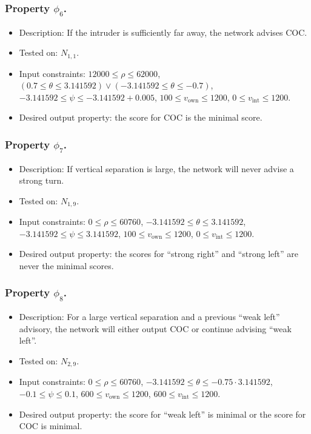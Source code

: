 \documentclass[a4paper]{llncs}
\begin{document}
\subsubsection{Property $\phi_6$.}
\begin{itemize}
\item Description:
  If the intruder is sufficiently far away,
  the network advises COC.
\item Tested on: $N_{1,1}$.
\item Input constraints:
    $12000 \leq \rho \leq 62000$,
    $(0.7 \leq \theta \leq 3.141592)
    \vee
    (-3.141592 \leq \theta \leq -0.7)$,
    $-3.141592 \leq \psi \leq -3.141592 + 0.005$,
    $100 \leq v_\text{own}\leq 1200$,
    $0 \leq v_\text{int}\leq 1200$.
\item Desired output property: the score for COC is the minimal score.
\end{itemize}


\subsubsection{Property $\phi_7$.}
\begin{itemize}
\item Description:
  If vertical separation is large,
  the network will never advise a strong turn.
\item Tested on: $N_{1,9}$.
\item Input constraints:
    $0 \leq \rho \leq 60760$,
    $-3.141592 \leq \theta \leq 3.141592$,
    $-3.141592 \leq \psi \leq 3.141592$,
    $100 \leq v_\text{own}\leq 1200$,
    $0 \leq v_\text{int}\leq 1200$.
\item Desired output property: the scores for ``strong right'' and
  ``strong left'' are never the minimal scores.
\end{itemize}

\subsubsection{Property $\phi_8$.}
\begin{itemize}
\item Description:
 For a large vertical separation and a previous
 ``weak left'' advisory, the network will either output COC or
 continue advising ``weak left''.
\item Tested on: $N_{2,9}$.
\item Input constraints:
    $0 \leq \rho \leq 60760$,
    $-3.141592 \leq \theta \leq -0.75\cdot 3.141592$,
    $-0.1 \leq \psi \leq 0.1$,
    $600 \leq v_\text{own}\leq 1200$,
    $600 \leq v_\text{int}\leq 1200$.
\item
Desired output property: the score for ``weak left'' is minimal or the
score for COC is minimal.
\end{itemize}
\end{document}
